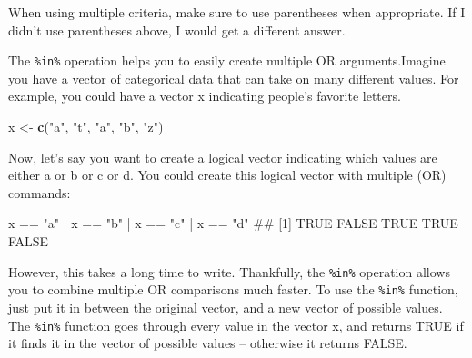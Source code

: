 \documentclass[]{book}
\newenvironment{Shaded}{\begin{snugshade}}{\end{snugshade}}
\newcommand{\KeywordTok}[1]{\textcolor[rgb]{0.13,0.29,0.53}{\textbf{{#1}}}}
\newcommand{\StringTok}[1]{\textcolor[rgb]{0.31,0.60,0.02}{{#1}}}
\newcommand{\NormalTok}[1]{{#1}}
\theoremstyle{definition}
\theoremstyle{definition}
\theoremstyle{remark}
\begin{document}
When using multiple criteria, make sure to use parentheses when
appropriate. If I didn't use parentheses above, I would get a different
answer.

The \texttt{\%in\%} operation helps you to easily create multiple OR
arguments.Imagine you have a vector of categorical data that can take on
many different values. For example, you could have a vector x indicating
people's favorite letters.

\begin{Shaded}
\begin{Highlighting}[]
\NormalTok{x <-}\StringTok{ }\KeywordTok{c}\NormalTok{(}\StringTok{"a"}\NormalTok{, }\StringTok{"t"}\NormalTok{, }\StringTok{"a"}\NormalTok{, }\StringTok{"b"}\NormalTok{, }\StringTok{"z"}\NormalTok{)}
\end{Highlighting}
\end{Shaded}

Now, let's say you want to create a logical vector indicating which
values are either a or b or c or d. You could create this logical vector
with multiple \textbar{} (OR) commands:

\begin{Shaded}
\begin{Highlighting}[]
\NormalTok{x ==}\StringTok{ "a"} \NormalTok{|}\StringTok{ }\NormalTok{x ==}\StringTok{ "b"} \NormalTok{|}\StringTok{ }\NormalTok{x ==}\StringTok{ "c"} \NormalTok{|}\StringTok{ }\NormalTok{x ==}\StringTok{ "d"}
\NormalTok{## [1]  TRUE FALSE  TRUE  TRUE FALSE}
\end{Highlighting}
\end{Shaded}

However, this takes a long time to write. Thankfully, the
\texttt{\%in\%} operation allows you to combine multiple OR comparisons
much faster. To use the \texttt{\%in\%} function, just put it in between
the original vector, and a new vector of possible values. The
\texttt{\%in\%} function goes through every value in the vector x, and
returns TRUE if it finds it in the vector of possible values --
otherwise it returns FALSE.

\begin{Shaded}
\end{Shaded}
\end{document}
